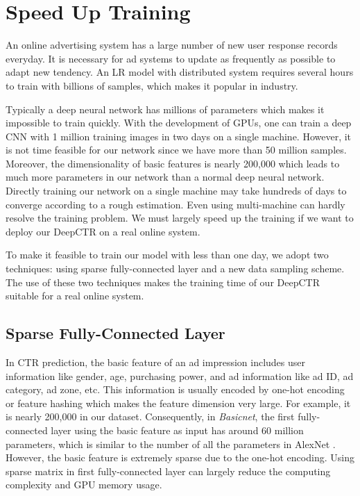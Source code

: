 \documentclass{sig-alternate}
\begin{document}
\section{Speed Up Training}
An online advertising system has a large number of new user response records everyday. It is necessary for ad systems  to update as frequently as possible to adapt  new tendency. An LR model with distributed system requires several hours to train with billions of samples, which makes it popular in industry.

Typically a deep neural network has millions of parameters which makes it impossible to train quickly. With the development of GPUs, one can train a deep CNN with 1 million training images in two days on a single machine. However, it is not time feasible for our network since we have more than 50 million samples. Moreover, the dimensionality of basic features is nearly 200,000 which leads to much more parameters in our network than a normal deep neural network. Directly training our network on a single machine may take hundreds of days to converge according to a rough estimation. Even using multi-machine can hardly resolve the training problem. We must largely speed up the training if we want to deploy our DeepCTR on a real online system. 

To make it feasible to train our model with less than one day, we adopt two techniques: using sparse fully-connected layer and a new data sampling scheme. The use of these two techniques makes the training time of our DeepCTR suitable for a real online system.
\subsection{Sparse Fully-Connected Layer}
In CTR prediction, the basic feature of an ad impression includes user information like gender, age, purchasing power, and ad information like ad ID, ad category, ad zone, etc. This information is usually encoded by one-hot encoding or feature hashing \cite{weinberger2009feature} which makes the feature dimension very large. For example, it is nearly 200,000 in our dataset. Consequently, in \emph{Basicnet}, the first fully-connected layer using the basic feature as input has around 60 million parameters, which is similar to the number of all the parameters in  AlexNet \cite{NIPS2012_4824}. However, the basic feature is extremely sparse due to the one-hot encoding. Using sparse matrix in first fully-connected layer can largely reduce the computing complexity and GPU memory usage.
\end{document}
